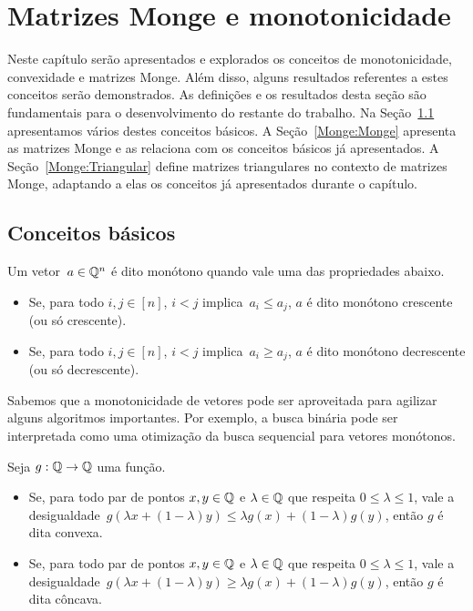 \chapter{Matrizes Monge e monotonicidade}
\label{Monge}


Neste capítulo serão apresentados e explorados os conceitos de monotonicidade, convexidade e matrizes Monge. Além disso, alguns resultados referentes a estes conceitos serão demonstrados. As definições e os resultados desta seção são fundamentais para o desenvolvimento do restante do trabalho. Na Seção~\ref{Monge:Basic} apresentamos vários destes conceitos básicos. A Seção~\ref{Monge:Monge} apresenta as matrizes Monge e as relaciona com os conceitos básicos já apresentados. A Seção~\ref{Monge:Triangular} define matrizes triangulares no contexto de matrizes Monge, adaptando a elas os conceitos já apresentados durante o capítulo.


\section{Conceitos básicos} \label{Monge:Basic}

\begin{defi}
Um vetor~${ a \in \mathbb{Q}^n }$ é dito monótono quando vale uma das propriedades abaixo.
\begin{itemize}
    \item Se, para todo $i,j \in [n]$, $i < j$ implica~$a_i \leq a_j$, $a$ é dito monótono crescente (ou só crescente).
    \item Se, para todo $i,j \in [n]$, $i < j$ implica~$a_i \geq a_j$, $a$ é dito monótono decrescente (ou só decrescente).
\end{itemize}
\end{defi}

Sabemos que a monotonicidade de vetores pode ser aproveitada para agilizar alguns algoritmos importantes. Por exemplo, a busca binária pode ser interpretada como uma otimização da busca  sequencial para vetores monótonos. 

\begin{defi}
Seja $g : \mathbb{Q} \to \mathbb{Q}$ uma função.
\begin{itemize}
    \item Se, para todo par de pontos $x,y \in \mathbb{Q}$ e $\lambda \in \mathbb{Q}$ que respeita $0 \leq \lambda \leq 1$, vale a desigualdade~${g(\lambda x + (1 - \lambda)y) \leq \lambda g(x) + (1 - \lambda) g(y)}$, então $g$ é dita convexa.
    \item Se, para todo par de pontos $x,y \in \mathbb{Q}$ e $\lambda \in \mathbb{Q}$ que respeita $0 \leq \lambda \leq 1$, vale a desigualdade~${g(\lambda x + (1 - \lambda)y) \geq \lambda g(x) + (1 - \lambda) g(y)}$, então $g$ é dita côncava.
\end{itemize}
\end{defi}

